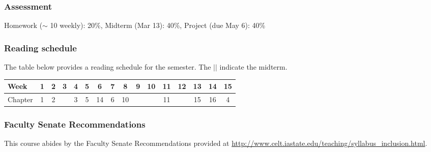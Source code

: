 \documentclass[12pt]{article}
\begin{document}
\subsubsection*{Assessment}

Homework ($\sim$ 10 weekly): 20\%, Midterm (Mar 13): 40\%, Project (due May 6): 40\%

\subsubsection*{Reading schedule}

The table below provides a reading schedule for the semester. The $\vert\vert$ indicate the midterm. 

\vspace{0.2in} 

\begin{tabular}{|l|ccc|cccc|cc||c|ccccc|}
\hline
Week & 1 & 2 & 3 & 4 & 5 & 6 & 7 & 8 & 9 & 10 & 11 & 12 & 13 & 14 & 15 \\
\hline
Chapter & 1 & 2  & & 3 & 5& 14 & 6 & 10 &  &  & 11 &  & 15 & 16 & 4 \\
\hline
\end{tabular}

\subsubsection*{Faculty Senate Recommendations}

This course abides by the Faculty Senate Recommendations provided at \url{http://www.celt.iastate.edu/teaching/syllabus_inclusion.html}.
\end{document}
